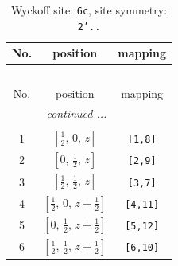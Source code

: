 \documentclass[fleqn,8pt]{jsarticle}
\begin{document}
\renewcommand{\arraystretch}{1.2}
\begin{longtable}{ccc}
\caption{Wyckoff site: {\tt 6c}, site symmetry: {\tt 2'..}}
 \\
 \hline \hline
No. & position & mapping \\ \hline \endfirsthead

\multicolumn{2}{l}{\tablename\ \thetable{}} \\
 \hline \hline
No. & position & mapping \\ \hline \endhead

 \hline \hline
\multicolumn{2}{r}{\footnotesize\it continued ...} \\ \endfoot

 \hline \hline
\multicolumn{2}{r}{} \\ \endlastfoot

1 & $\left[ \frac{1}{2},\, 0,\, z \right]$ & {\tt [1,8]} \\ \hline
2 & $\left[ 0,\, \frac{1}{2},\, z \right]$ & {\tt [2,9]} \\ \hline
3 & $\left[ \frac{1}{2},\, \frac{1}{2},\, z \right]$ & {\tt [3,7]} \\ \hline
4 & $\left[ \frac{1}{2},\, 0,\, z + \frac{1}{2} \right]$ & {\tt [4,11]} \\ \hline
5 & $\left[ 0,\, \frac{1}{2},\, z + \frac{1}{2} \right]$ & {\tt [5,12]} \\ \hline
6 & $\left[ \frac{1}{2},\, \frac{1}{2},\, z + \frac{1}{2} \right]$ & {\tt [6,10]} \\
\end{longtable}
\renewcommand{\arraystretch}{1.2}
\end{document}
